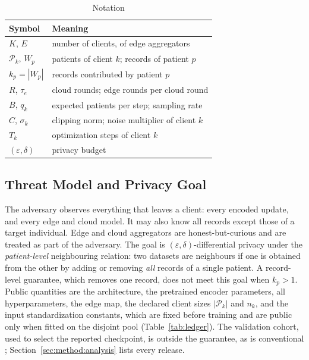 \begin{table}[!t]
\centering
\caption{Notation}
\label{tab:notation}
\small
\begin{tabular}{ll}
\toprule
Symbol & Meaning \\
\midrule
$K$, $E$               & number of clients, of edge aggregators \\
$\mathcal{P}_k$, $W_p$ & patients of client $k$; records of patient $p$ \\
$k_p = |W_p|$          & records contributed by patient $p$ \\
$R$, $\tau_e$          & cloud rounds; edge rounds per cloud round \\
$B$, $q_k$             & expected patients per step; sampling rate \\
$C$, $\sigma_k$        & clipping norm; noise multiplier of client $k$ \\
$T_k$                  & optimization steps of client $k$ \\
$(\varepsilon,\delta)$ & privacy budget \\
\bottomrule
\end{tabular}
\end{table}

\subsection{Threat Model and Privacy Goal}
The adversary observes everything that leaves a client: every encoded update,
and every edge and cloud model. It may also
know all records except those of a target individual. Edge and cloud
aggregators are honest-but-curious and are treated as part of the adversary.
The goal is $(\varepsilon,\delta)$-differential privacy \cite{ref8} under the
\emph{patient-level} neighbouring relation: two datasets are neighbours if one
is obtained from the other by adding or removing \emph{all} records of a
single patient. A record-level guarantee, which removes one record, does not
meet this goal when $k_p > 1$. Public quantities are the architecture, the
pretrained encoder parameters, all hyperparameters, the edge map, the declared client
sizes $|\mathcal{P}_k|$ and $n_k$, and the input standardization constants,
which are fixed before training and are public only when fitted on the
disjoint pool (Table~\ref{tab:ledger}). The validation cohort, used to select the
reported checkpoint, is outside the guarantee, as is conventional
\cite{ref6}; Section~\ref{sec:method:analysis} lists every release.

